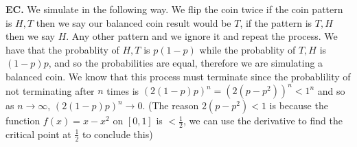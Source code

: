 \documentclass[12pt]{article}
\newenvironment{ques}{\vspace{2 ex}}{\vspace{2 ex}}
\theoremstyle{definition}
\begin{document}
\begin{ques}
	\textbf{EC.}  %
		We simulate in the following way. We flip the coin twice if the
		coin pattern is $H,T$ then we say our balanced coin result
		would be $T$, if the pattern is $T,H$ then we say $H$. Any
		other pattern and we ignore it and repeat the process. We have
		that the probablity of $H, T$ is $p(1-p)$ while the probablity
		of $T,H$ is $(1-p)p$, and so the probabilities are equal,
		therefore we are simulating a balanced coin. We know that this
		process must terminate since the probablility of not
		terminating after $n$ times is $(2(1-p)p)^n = (2(p - p^2))^n <
		1^n$ and so as $n \to \infty$, $(2(1-p)p)^n \to 0$. (The reason
		$2(p - p^2) < 1$ is because the function $f(x) = x - x^2$ on
		$[0,1]$ is $<\frac{1}{2}$, we can use the derivative to find
		the critical point at $\frac{1}{2}$ to conclude this)

\end{ques}
\end{document}
